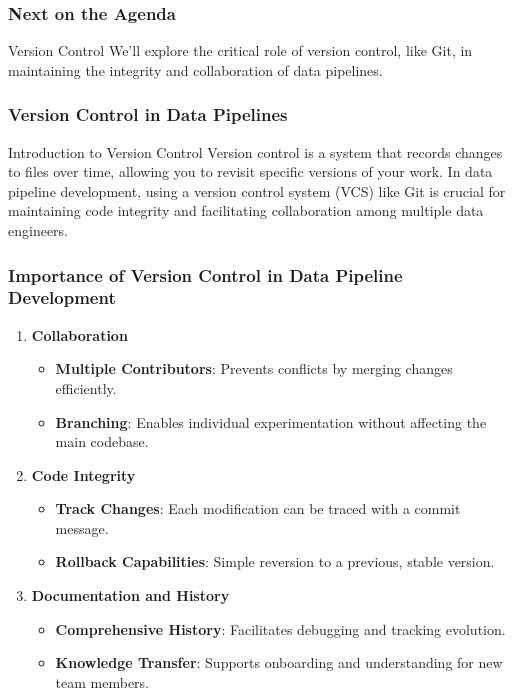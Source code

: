\documentclass{beamer}
\begin{document}
\begin{frame}[fragile]
    \frametitle{Next on the Agenda}
    \begin{block}{Version Control}
        We'll explore the critical role of version control, like Git, in maintaining the integrity and collaboration of data pipelines.
    \end{block}
\end{frame}

\begin{frame}
    \frametitle{Version Control in Data Pipelines}
    \begin{block}{Introduction to Version Control}
        Version control is a system that records changes to files over time, allowing you to revisit specific versions of your work. 
        In data pipeline development, using a version control system (VCS) like Git is crucial for maintaining code integrity and facilitating collaboration among multiple data engineers.
    \end{block}
\end{frame}

\begin{frame}
    \frametitle{Importance of Version Control in Data Pipeline Development}
    \begin{enumerate}
        \item \textbf{Collaboration}
            \begin{itemize}
                \item \textbf{Multiple Contributors}: Prevents conflicts by merging changes efficiently.
                \item \textbf{Branching}: Enables individual experimentation without affecting the main codebase.
            \end{itemize}
        \item \textbf{Code Integrity}
            \begin{itemize}
                \item \textbf{Track Changes}: Each modification can be traced with a commit message.
                \item \textbf{Rollback Capabilities}: Simple reversion to a previous, stable version.
            \end{itemize}
        \item \textbf{Documentation and History}
            \begin{itemize}
                \item \textbf{Comprehensive History}: Facilitates debugging and tracking evolution.
                \item \textbf{Knowledge Transfer}: Supports onboarding and understanding for new team members.
            \end{itemize}
    \end{enumerate}
\end{frame}
\end{document}
